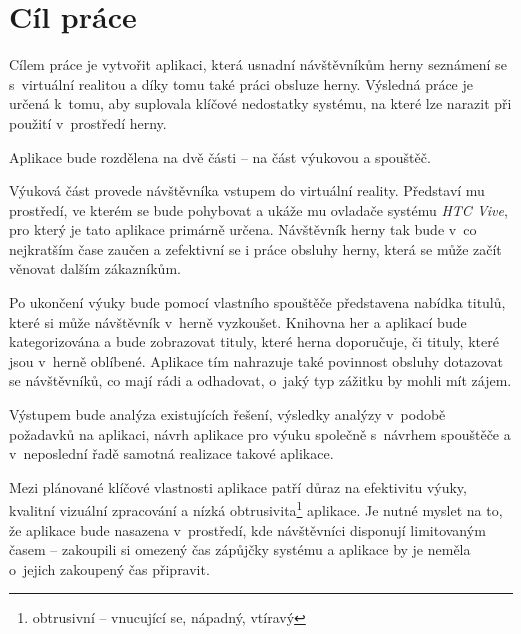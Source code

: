 \chapter{Cíl práce}\label{cuxedl-pruxe1ce}

Cílem práce je vytvořit aplikaci, která usnadní návštěvníkům
herny seznámení se s~virtuální realitou a díky tomu také práci obsluze herny.
Výsledná práce je určená k~tomu, aby suplovala klíčové nedostatky
systému, na které lze narazit při použití v~prostředí herny.

Aplikace bude rozdělena na dvě části -- na část výukovou a spouštěč.

Výuková část provede návštěvníka vstupem do virtuální reality. Představí mu prostředí, ve kterém se bude pohybovat a ukáže mu ovladače systému \emph{HTC Vive}, pro který je tato aplikace
primárně určena. Návštěvník herny tak bude v~co nejkratším čase zaučen a
zefektivní se i práce obsluhy herny, která se může začít věnovat dalším zákazníkům.

Po ukončení výuky bude pomocí vlastního spouštěče představena nabídka
titulů, které si může návštěvník v~herně vyzkoušet. Knihovna her a
aplikací bude kategorizována a bude zobrazovat tituly, které
herna doporučuje, či tituly, které jsou v~herně oblíbené. Aplikace tím nahrazuje také povinnost obsluhy dotazovat se návštěvníků, co mají rádi a
odhadovat, o~jaký typ zážitku by mohli mít zájem.

\newpage

Výstupem bude analýza existujících řešení, výsledky analýzy v~podobě
požadavků na aplikaci, návrh aplikace pro výuku společně s~návrhem
spouštěče a v~neposlední řadě samotná realizace takové aplikace.

Mezi plánované klíčové vlastnosti aplikace patří důraz na efektivitu výuky,
kvalitní vizuální zpracování a nízká obtrusivita\footnote{obtrusivní -- vnucující se, nápadný, vtíravý} aplikace. Je nutné
myslet na to, že aplikace bude nasazena v~prostředí, kde návštěvníci
disponují limitovaným časem -- zakoupili si omezený čas zápůjčky systému
a aplikace by je neměla o~jejich zakoupený čas připravit.
